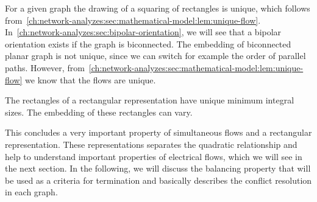 For a given graph the drawing of a squaring of rectangles is unique, which
follows from~\cref{ch:network-analyzes:sec:mathematical-model:lem:unique-flow}.
% 
In~\cref{ch:network-analyzes:sec:bipolar-orientation}, we will see that a
bipolar orientation exists if the graph is biconnected. The embedding of
biconnected planar graph is not unique, since we can switch for example the
order of parallel paths. However,
from~\cref{ch:network-analyzes:sec:mathematical-model:lem:unique-flow} we know
that the flows are unique.
% 
\begin{lemma}
    The rectangles of a rectangular representation have unique minimum integral
    sizes. The embedding of these rectangles can vary.
    \label{ch:network-analyzes:lem:unique-partition-rectangular-representation}
\end{lemma}
% 
This concludes a very important property of simultaneous flows and a rectangular
representation. 
% 
% 
These representations separates the quadratic relationship and help to
understand important properties of electrical flows, which we will see in the
next section. In the following, we will discuss the balancing property that will
be used as a criteria for termination and basically describes the conflict
resolution in each graph.
% 
